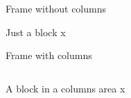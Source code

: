 \documentclass[t]{beamer}
\begin{document}
\begin{frame}{Frame without columns}
  \begin{block}{Just a block}
  x
  \end{block}
\end{frame}

\begin{frame}{Frame with columns}
  \begin{columns}[t, onlytextwidth]
    \begin{column}{0.45\textwidth}
    	\vspace*{-\baselineskip}
      \begin{block}{A block in a columns area}
      x
      \end{block}
    \end{column}
  \end{columns}
\end{frame}
\end{document}
